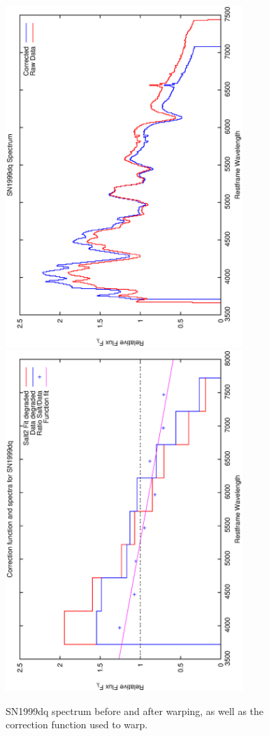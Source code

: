 \clearpage

\begin{figure}[p]
\centering
\includegraphics[angle=-90,width=0.8\textwidth]{./figures/spectrabeforeafter/SN1999dq_handpicked_v001_v023_before_after_spectra.ps}
\hfill
\includegraphics[angle=-90,width=0.8\textwidth]{./figures/corrections/SN1999dq_v001_correction.ps}
\hfill
\caption{SN1999dq spectrum before and after warping, as well as the correction function used to warp.}
\label{fig:SN1999dqfour1}
\end{figure}

